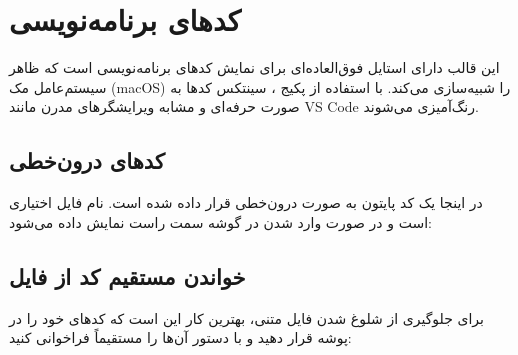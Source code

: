 \chapter{کدهای برنامه‌نویسی}
\label{chap:codes}

این قالب دارای استایل فوق‌العاده‌ای برای نمایش کدهای برنامه‌نویسی است که ظاهر سیستم‌عامل مک (macOS) را شبیه‌سازی می‌کند. با استفاده از پکیج ، سینتکس کدها به صورت حرفه‌ای و مشابه ویرایشگرهای مدرن مانند VS Code رنگ‌آمیزی می‌شوند.

\section{کدهای درون‌خطی}
در اینجا یک کد پایتون به صورت درون‌خطی قرار داده شده است. نام فایل اختیاری است و در صورت وارد شدن در گوشه سمت راست نمایش داده می‌شود:


\section{خواندن مستقیم کد از فایل}
برای جلوگیری از شلوغ شدن فایل متنی، بهترین کار این است که کدهای خود را در پوشه  قرار دهید و با دستور  آن‌ها را مستقیماً فراخوانی کنید:
